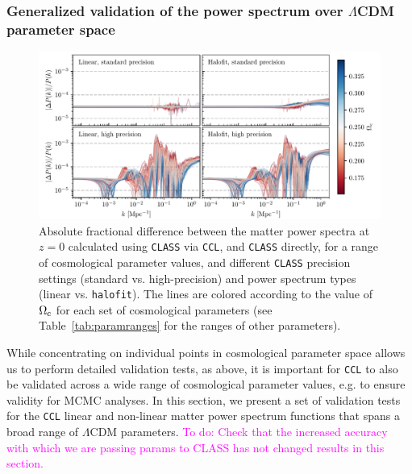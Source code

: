 \documentclass[\docopts]{\docclass}
\newcommand{\todo}[1]{\textcolor{magenta}{To do: #1}}
\newcommand{\ccl}{{\tt CCL}\xspace}
\newcommand{\halofit}{{\tt halofit}\xspace}
\newcommand{\class}{{\tt CLASS}\xspace}
\begin{document}
\subsubsection{Generalized validation of the power spectrum over $\Lambda$CDM parameter space}
\label{ss:classval2}

\begin{figure}
\centering
\includegraphics[width=1\textwidth]{pkdev_v2_z0_00}
\caption{Absolute fractional difference between the matter power spectra at $z=0$ calculated using \class via \ccl, and \class directly, for a range of cosmological parameter values, and different \class precision settings (standard vs. high-precision) and power spectrum types (linear vs. \halofit). The lines are colored according to the value of $\Omega_{\rm c}$ for each set of cosmological parameters (see Table~\ref{tab:paramranges} for the ranges of other parameters). }
\label{fig:power_paramspace}
\end{figure}

While concentrating on individual points in cosmological parameter space allows us to perform detailed validation tests, as above, it is important for \ccl to also be validated across a wide range of cosmological parameter values, e.g. to ensure validity for MCMC analyses. In this section, we present a set of validation tests for the \ccl linear and non-linear matter power spectrum functions that spans a broad range of $\Lambda$CDM parameters. \todo{Check that the increased accuracy with which we are passing params to CLASS has not changed results in this section.}
\end{document}

